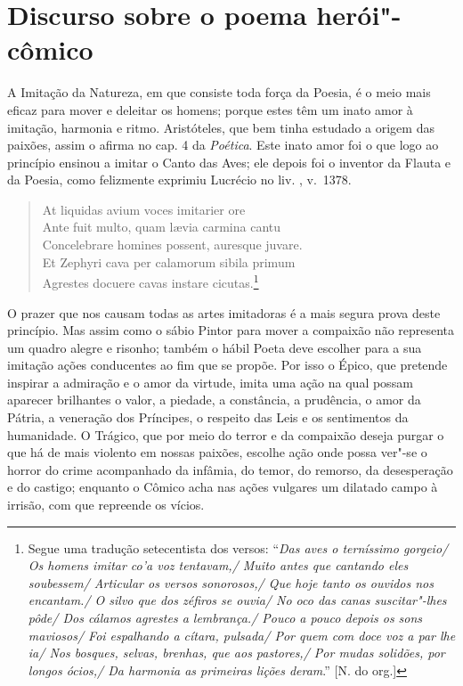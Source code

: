 \chapter{Discurso sobre o poema herói"-cômico}

A Imitação da Natureza, em que consiste toda força da Poesia, 				\index{\Iminat}
é o meio mais eficaz para mover e deleitar os homens; 					\index{\Util}
porque estes têm um inato amor à imitação, harmonia e ritmo.
Aristóteles, que bem tinha estudado a origem das paixões, assim o afirma no 
cap. 4 da \textit{Poética}. 							\index{\Arist}
Este inato amor foi o que logo ao princípio ensinou a imitar o Canto das Aves; ele 
depois foi o inventor da Flauta e da Poesia, como felizmente exprimiu Lucrécio
no liv. , v.~1378.								\index{\Lucre} \index{\Poet}


\begin{verse}
At liquidas avium voces imitarier ore \\
Ante fuit multo, quam l\ae via carmina cantu \\
Concelebrare homines possent, auresque juvare. \\
Et Zephyri cava per calamorum sibila primum \\
Agrestes docuere cavas instare cicutas.\footnote{ Segue uma tradução
setecentista dos versos: ``\textit{Das aves o terníssimo gorgeio/ Os homens
imitar co'a voz tentavam,/ Muito antes que cantando eles soubessem/ Articular
os versos sonorosos,/ Que hoje tanto os ouvidos nos encantam./ O silvo que dos
zéfiros se ouvia/ No oco das canas suscitar"-lhes pôde/ Dos cálamos agrestes a 
lembrança./ Pouco a pouco depois os sons maviosos/ Foi espalhando a cítara,
pulsada/ Por quem com doce voz a par lhe ia/ Nos bosques, selvas, brenhas, que
aos pastores,/ Por mudas solidões, por longos ócios,/ Da harmonia as primeiras
lições deram}.'' \cite[p. 172]{lucrecio} [N. do org.] }\\[10pt] 				\index{\Zefir}
\end{verse}

O prazer que nos causam todas as artes imitadoras
é a mais segura prova deste princípio. Mas assim 
como o sábio Pintor para mover a compaixão não 						%
representa um quadro alegre e risonho; também o hábil 
Poeta deve escolher para a sua imitação ações 
conducentes ao fim que se propõe. Por isso o Épico, 					\index{\Epico}
que pretende inspirar a admiração e o amor da virtude, 
imita uma ação na qual possam aparecer brilhantes o valor,
a piedade, a constância, a prudência, o amor da Pátria, 
a veneração dos Príncipes, o respeito das Leis e os 
sentimentos da humanidade. O Trágico, que por meio do terror 				\index{\Trag}
e da compaixão deseja purgar o que há de mais violento em  
nossas paixões, escolhe ação onde possa ver"-se o horror 
do crime acompanhado da infâmia, do temor, do remorso, da desesperação 
e do castigo; enquanto o Cômico acha nas ações vulgares 				\index{\Comic}
um dilatado campo à irrisão, com que repreende os vícios.

